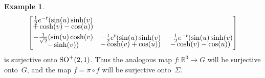 \documentclass[pdftex]{sigma}
\numberwithin{equation}{section}
\theoremstyle{definition}
\newtheorem{exmpl}[teo]{Example}
\begin{document}
\begin{exmpl}
\begin{gather*}
\begin{bmatrix}
\begin{array}{@{}c@{}}\frac{1}{2}e^{-t}(\sin(u) \sinh(v)\vspace{-1mm}\\ +\cosh(v)-\cos(u))\end{array}
\vspace{1mm}\\
\begin{array}{@{}c@{}}-\frac{1}{\sqrt{2}}(\sin(u)\cosh(v)\vspace{-1mm}\\ -\sinh(v))\end{array} &
\begin{array}{@{}c@{}}-\frac{1}{2}e^t(\sin(u)\sinh(v)\vspace{-1mm}\\ -\cosh(v)+\cos(u))\end{array} &
\begin{array}{@{}c@{}}-\frac{1}{2}e^{-t}(\sin(u)\sinh(v)\vspace{-1mm}\\ -\cosh(v)-\cos(u))\end{array}
\end{bmatrix}
\end{gather*}
is surjective onto ${\rm SO}^+(2,1)$.
Thus the analogous map $f:\mathbb{R}^3 \to G$ will be surjective onto~$G$, and the map $\bar{f} = \pi \circ f$ will be
surjective onto~$\Sigma$.


\end{exmpl}
\end{document}
